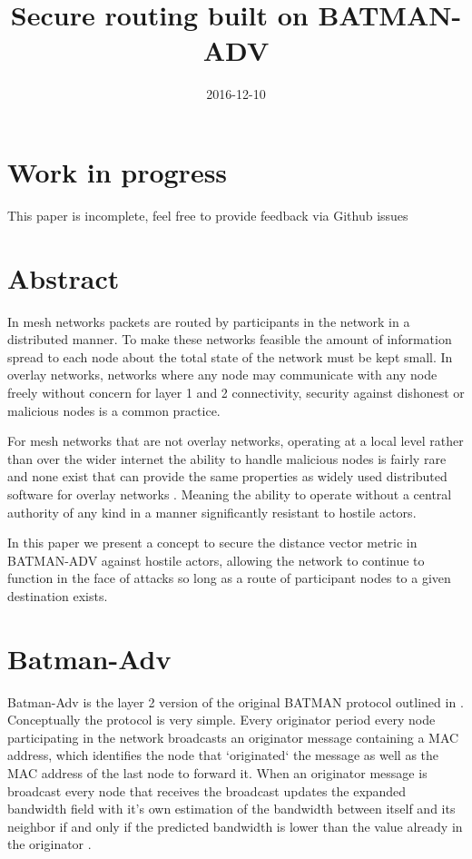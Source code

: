 \documentclass[11pt]{article}
\title{\textbf{Secure routing built on BATMAN-ADV}}
\date{2016-12-10}
\begin{document}
\maketitle

\section{Work in progress}

This paper is incomplete, feel free to provide feedback via Github issues

\tableofcontents

\section{Abstract}

In mesh networks packets are routed by participants in the network in a distributed manner. To make these networks feasible the amount of information spread to each node about the total state of the network must be kept small. In overlay networks, networks where any node may communicate with any node freely without concern for layer 1 and 2 connectivity, security against dishonest or malicious nodes is a common practice.  

For mesh networks that are not overlay networks, operating at a local level rather than over the wider internet the ability to handle malicious nodes is fairly rare and none exist that can provide the same properties as widely used distributed software for overlay networks \cite{routesec}. Meaning the ability to operate without a central authority of any kind in a manner significantly resistant to hostile actors. 

In this paper we present a concept to secure the distance vector metric in BATMAN-ADV against hostile actors, allowing the network to continue to function in the face of attacks so long as a route of participant nodes to a given destination exists.

\section{Batman-Adv}

    Batman-Adv is the layer 2 version of the original BATMAN protocol outlined in \cite{batman}. Conceptually the protocol is very simple. Every originator period every node participating in the network broadcasts an originator message containing a MAC address, which identifies the node that `originated` the message as well as the MAC address of the last node to forward it.  When an originator message is broadcast every node that receives the broadcast updates the expanded bandwidth field with it's own estimation of the bandwidth between itself and its neighbor if and only if the predicted bandwidth is lower than the value already in the originator \cite{batroam}.
    
\end{document}
